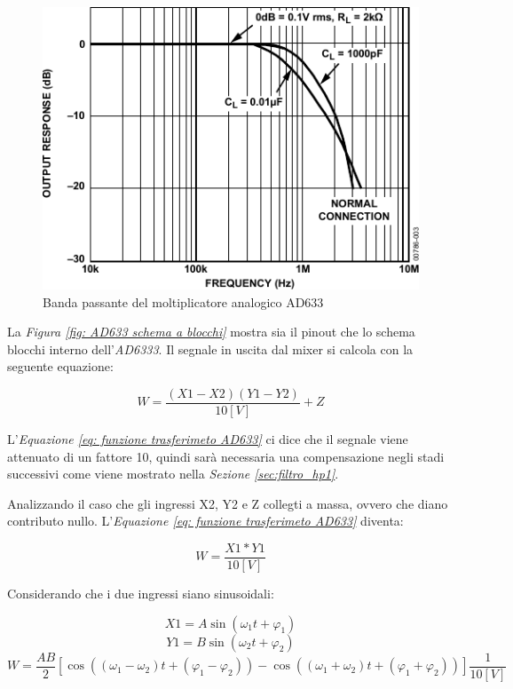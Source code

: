\documentclass[titlepage]{report}
\begin{document}
	\begin{figure}[H]
		\centering
		\includegraphics[scale=1]{Immagini/ad633_bp.pdf}
		\caption{Banda passante del moltiplicatore analogico AD633}
		\label{fig:sch_ad633}
	\end{figure}

	
	\noindent La \textit{Figura \ref{fig: AD633 schema a blocchi}} mostra sia il pinout che lo schema  blocchi interno dell'\textit{AD6333}.
	Il segnale in uscita dal mixer si calcola con la seguente equazione:

	\begin{equation}
		\label{eq: funzione trasferimeto AD633}
		W = \frac{(X1 - X2)(Y1 - Y2)}{10 [V]}  + Z 
	\end{equation}

	L'\textit{Equazione \ref{eq: funzione trasferimeto AD633}} ci dice che il segnale viene attenuato di un fattore 10, quindi sarà necessaria una compensazione negli stadi successivi come viene mostrato nella \textit{Sezione \ref{sec:filtro_hp1}}. 

	\noindent Analizzando il caso che gli ingressi X2, Y2 e Z collegti a massa, ovvero che diano contributo nullo. L'\textit{Equazione \ref{eq: funzione trasferimeto AD633}} diventa:


	\begin{equation}
		\label{eq: prodotto sinusoidi AD633}
		W = \frac{X1 * Y1}{10 [V]}
	\end{equation}


	Considerando che i due ingressi siano sinusoidali:

	\begin{equation}
		\label{eq: X1 sinusoidale}
		X1 = A\sin (\omega _1t + \varphi _1)
	\end{equation}
	\begin{equation}
		\label{eq: XY sinusoidale}
		Y1 = B\sin (\omega _2t + \varphi _2)
	\end{equation}
	\begin{equation}
		\label{eq:prodotto sinusoidi con fase}
		W = \frac{AB}{2}[\cos ((\omega _1 - \omega _2)t + (\varphi _1 - \varphi _2)) - \cos ((\omega _1 +\omega _2)t + (\varphi _1 + \varphi _2))]\frac{1}{10[V]}
	\end{equation}
\end{document}
